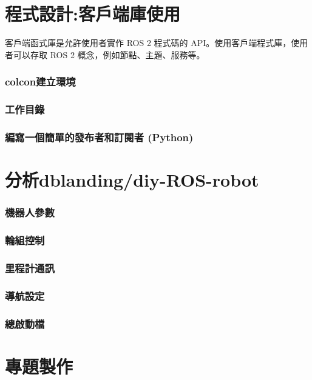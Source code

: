 \documentclass{article}
\begin{document}
\part{程式設計:客戶端庫使用}
客戶端函式庫是允許使用者實作 ROS 2 程式碼的 API。使用客戶端程式庫，使用者可以存取 ROS 2 概念，例如節點、主題、服務等。
\section{colcon建立環境}

\section{工作目錄}

\section{編寫一個簡單的發布者和訂閱者 (Python)}




\part{分析dblanding/diy-ROS-robot}

\section{機器人參數}

\section{輪組控制}

\section{里程計通訊}

\section{導航設定}

\section{總啟動檔}


\part{專題製作}
\end{document}
